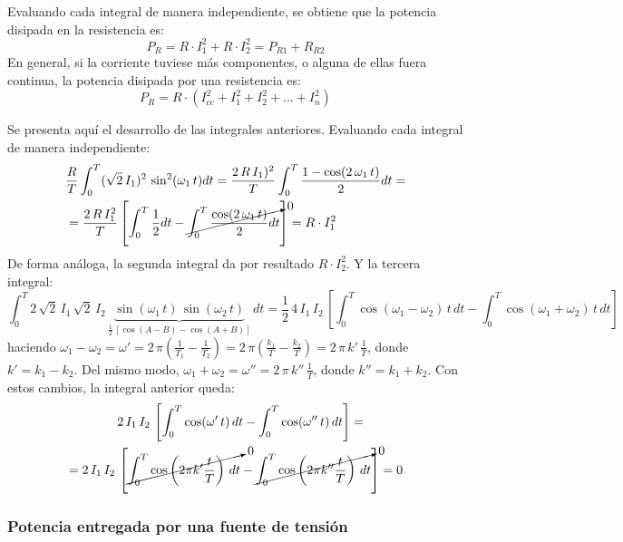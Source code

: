 Evaluando cada integral de manera independiente, se obtiene que la
potencia disipada en la resistencia es:
\begin{equation*}
  P_R=R\cdot I_1^2+R\cdot I_2^2 = P_{R1} + R_{R2}
\end{equation*}
En general, si la corriente tuviese más componentes, o alguna de ellas
fuera continua, la potencia disipada por una resistencia es:
\begin{equation}\label{eq:P_R_superposicion}
  \boxed{P_R=R\cdot\left(I_{cc}^2+I_1^2+I_2^2+...+I_n^2 \right)}
\end{equation}
\begin{remark}
  Se presenta aquí el desarrollo de las integrales
  anteriores. Evaluando cada integral de manera independiente:
  \begin{align*}
    &\dfrac{R}{T} \int_0^T (\sqrt{2}\,I_{1})^2\,\sin^2(\omega_1\,t)dt=\dfrac{2\,R\,I_{1})^2}{T}\int_0^T\dfrac{1-\cos(2\,\omega_1\,t)}{2}dt=\\
    &=\dfrac{2\,R\,I_{1}^2}{T}\left[\int_0^T\dfrac{1}{2}dt-\cancelto{0}{\int_0^T \dfrac{\cos(2\,\omega_1\,t)}{2}dt}\right]=R\cdot I_1^2
  \end{align*}
  De forma análoga, la segunda integral da por resultado
  $R\cdot I_2^2$. Y la tercera integral:
  \begin{equation*}
    \int_0^T 2\,\sqrt{2}\,I_{1}\, \sqrt{2}\,I_{2}\,\underbrace{\sin(\omega_1\,t)\,\sin(\omega_2\,t)}_{\frac{1}{2}\,\left[\cos(A-B)-\cos(A+B)\right]}\,dt=\dfrac{1}{2}\,4\,I_1\,I_2\,\left[\int_0^T\cos(\omega_1-\omega_2)\,t\,dt-\int_0^T\cos(\omega_1+\omega_2)\,t\,dt\right]
  \end{equation*}
  haciendo
  $\omega_1-\omega_2=\omega'=2\,\pi\left(\frac{1}{T_1}-\frac{1}{T_2}
  \right)=2\,\pi\left(\frac{k_1}{T}-\frac{k_2}{T}\right)=2\,\pi\,k'\,\frac{1}{T}$,
  donde $k'=k_1-k_2$. Del mismo modo,
  $\omega_1+\omega_2=\omega''=2\,\pi\,k''\,\frac{1}{T}$, donde
  $k''=k_1+k_2$. Con estos cambios, la integral anterior queda:
  \begin{align*}
    &2\,I_1\,I_2\,\left[\int_0^T\cos(\omega'\,t)\,dt-\int_0^T\cos(\omega''\,t)\,dt\right]=\\
    =2\,I_1\,I_2\,&\left[\cancelto{0}{\int_0^T \cos\left(2\pi k'\dfrac{t}{T}\right)\,dt}-\cancelto{0}{\int_0^T\cos\left(2\pi k''\dfrac{t}{T}\right)\,dt}\right]=0
  \end{align*}
\end{remark}


\subsubsection{Potencia entregada por una fuente de tensión}
    
